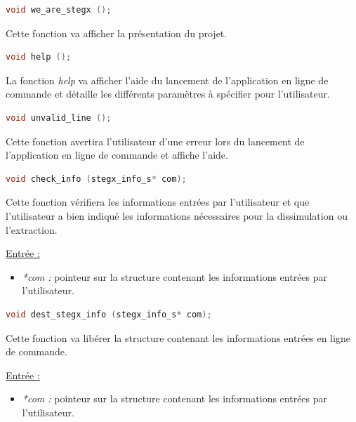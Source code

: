 \documentclass[11pt]{article}
\begin{document}
\begin{lstlisting}[language=c]
void we_are_stegx ();
\end{lstlisting}

Cette fonction va afficher la présentation du projet. \newline

\begin{lstlisting}[language=c]
void help ();
\end{lstlisting}

La fonction \textit{help} va afficher l'aide du lancement de l'application 
en ligne de commande et détaille les différents paramètres à spécifier 
pour l'utilisateur. \newline

\begin{lstlisting}[language=c]
void unvalid_line ();
\end{lstlisting}

Cette fonction avertira l'utilisateur d'une erreur lors du lancement 
de l'application en ligne de commande et affiche l'aide. \newline

\begin{lstlisting}[language=c]
void check_info (stegx_info_s* com);
\end{lstlisting}

Cette fonction vérifiera les informations entrées par l'utilisateur et 
que l'utilisateur a bien indiqué les informations nécessaires pour 
la dissimulation ou l'extraction. \newline

\underline{Entrée :} 
\begin{itemize}
\item \textit{*com :} pointeur sur la structure contenant les informations 
entrées par l'utilisateur. 
\newline 
\end{itemize}

\begin{lstlisting}[language=c]
void dest_stegx_info (stegx_info_s* com);
\end{lstlisting}

Cette fonction va libérer la structure contenant les informations entrées 
en ligne de commande. \newline

\underline{Entrée :} 
\begin{itemize}
\item \textit{*com :} pointeur sur la structure contenant les informations 
entrées par l'utilisateur. 
\newline 
\end{itemize}
\end{document}
